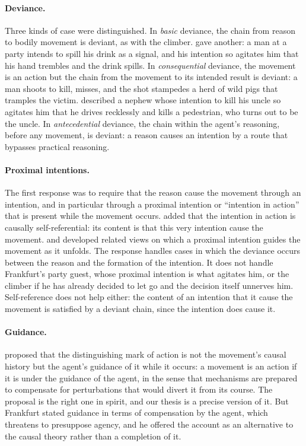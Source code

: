 \documentclass{situationist-preprint}
\begin{document}
\paragraph{Deviance.} Three kinds of case were distinguished. In \emph{basic} deviance, the chain from reason to bodily movement is deviant, as with the climber. \citet{Frankfurt1978} gave another: a man at a party intends to spill his drink as a signal, and his intention so agitates him that his hand trembles and the drink spills. In \emph{consequential} deviance, the movement is an action but the chain from the movement to its intended result is deviant: a man shoots to kill, misses, and the shot stampedes a herd of wild pigs that tramples the victim. \citet{Chisholm1966} described a nephew whose intention to kill his uncle so agitates him that he drives recklessly and kills a pedestrian, who turns out to be the uncle. In \emph{antecedential} deviance, the chain within the agent's reasoning, before any movement, is deviant: a reason causes an intention by a route that bypasses practical reasoning.

\paragraph{Proximal intentions.} The first response was to require that the reason cause the movement through an intention, and in particular through a proximal intention or \enquote{intention in action} that is present while the movement occurs. \citet{Searle1983} added that the intention in action is causally self-referential: its content is that this very intention cause the movement. \citet{Brand1984} and \citet{Mele1992} developed related views on which a proximal intention guides the movement as it unfolds. The response handles cases in which the deviance occurs between the reason and the formation of the intention. It does not handle Frankfurt's party guest, whose proximal intention is what agitates him, or the climber if he has already decided to let go and the decision itself unnerves him. Self-reference does not help either: the content of an intention that it cause the movement is satisfied by a deviant chain, since the intention does cause it.

\paragraph{Guidance.} \citet{Frankfurt1978} proposed that the distinguishing mark of action is not the movement's causal history but the agent's guidance of it while it occurs: a movement is an action if it is under the guidance of the agent, in the sense that mechanisms are prepared to compensate for perturbations that would divert it from its course. The proposal is the right one in spirit, and our thesis is a precise version of it. But Frankfurt stated guidance in terms of compensation by the agent, which threatens to presuppose agency, and he offered the account as an alternative to the causal theory rather than a completion of it.
\end{document}

